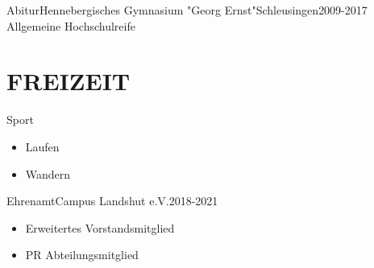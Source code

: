 \documentclass[10pt, a4paper]{article}
\begin{document}
\begin{cvitem}{Abitur}{Hennebergisches Gymnasium "Georg Ernst"}{Schleusingen}{2009-2017}
    Allgemeine Hochschulreife
\end{cvitem}




\section{FREIZEIT}

\begin{projitem}{Sport}{}{}
    \begin{itemize}
        \item Laufen
        \item Wandern
    \end{itemize}
\end{projitem}

\begin{projitem}{Ehrenamt}{Campus Landshut e.V.}{2018-2021}
   \begin{itemize}
        \item Erweitertes Vorstandsmitglied 
        \item PR Abteilungsmitglied
    \end{itemize}
\end{projitem}





\fincols
\end{document}
